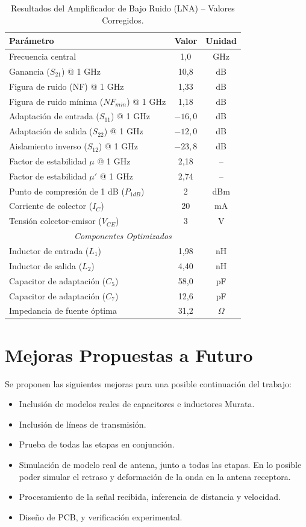 \begin{table}[htbp]
\centering
\caption{Resultados del Amplificador de Bajo Ruido (LNA) -- Valores Corregidos.}
\label{tab:resultados_lna}
\begin{tabular}{@{}lcc@{}}
\toprule
\textbf{Parámetro} & \textbf{Valor} & \textbf{Unidad} \\
\midrule
Frecuencia central & 1,0 & GHz \\
Ganancia ($S_{21}$) @ 1 GHz & 10,8 & dB \\
Figura de ruido (NF) @ 1 GHz & 1,33 & dB \\
Figura de ruido mínima ($NF_{min}$) @ 1 GHz & 1,18 & dB \\
Adaptación de entrada ($S_{11}$) @ 1 GHz & $-16,0$ & dB \\
Adaptación de salida ($S_{22}$) @ 1 GHz & $-12,0$ & dB \\
Aislamiento inverso ($S_{12}$) @ 1 GHz & $-23,8$ & dB \\
Factor de estabilidad $\mu$ @ 1 GHz & 2,18 & -- \\
Factor de estabilidad $\mu'$ @ 1 GHz & 2,74 & -- \\
Punto de compresión de 1 dB ($P_{1dB}$) & 2 & dBm \\
Corriente de colector ($I_C$) & 20 & mA \\
Tensión colector-emisor ($V_{CE}$) & 3 & V \\
\midrule
\multicolumn{3}{c}{\textit{Componentes Optimizados}} \\
\midrule
Inductor de entrada ($L_1$) & 1,98 & nH \\
Inductor de salida ($L_2$) & 4,40 & nH \\
Capacitor de adaptación ($C_5$) & 58,0 & pF \\
Capacitor de adaptación ($C_7$) & 12,6 & pF \\
Impedancia de fuente óptima & 31,2 & $\Omega$ \\
\bottomrule
\end{tabular}
\end{table}

\section{Mejoras Propuestas a Futuro}

Se proponen las siguientes mejoras para una posible continuación del trabajo:

\begin{itemize}
    \item Inclusión de modelos reales de capacitores e inductores Murata.
    \item Inclusión de líneas de transmisión.
    \item Prueba de todas las etapas en conjunción.
    \item Simulación de modelo real de antena, junto a todas las etapas. En lo posible poder simular el retraso y deformación de la onda en la antena receptora.
    \item Procesamiento de la señal recibida, inferencia de distancia y velocidad.
    \item Diseño de PCB, y verificación experimental.
\end{itemize}
